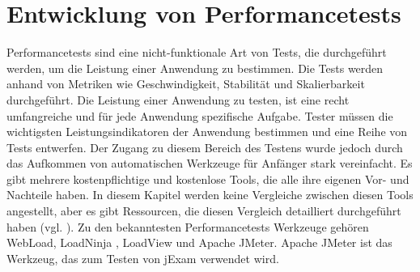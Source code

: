 \section{Entwicklung von Performancetests}

Performancetests sind eine nicht-funktionale Art von Tests, die
durchgeführt werden, um die Leistung einer Anwendung zu bestimmen.
Die Tests werden anhand von Metriken wie Geschwindigkeit, Stabilität
und Skalierbarkeit durchgeführt. Die Leistung einer Anwendung zu testen,
ist eine recht umfangreiche und für jede Anwendung spezifische Aufgabe.
Tester müssen die wichtigsten Leistungsindikatoren der Anwendung bestimmen
und eine Reihe von Tests entwerfen. Der Zugang zu diesem Bereich des
Testens wurde jedoch durch das Aufkommen von automatischen Werkzeuge für
Anfänger stark vereinfacht.  Es gibt mehrere kostenpflichtige und kostenlose
Tools, die alle ihre eigenen Vor- und Nachteile haben. In diesem Kapitel
werden keine Vergleiche zwischen diesen Tools angestellt, aber es gibt
Ressourcen, die diesen Vergleich detailliert durchgeführt haben
(vgl. \cite{perfComp}).  Zu den bekanntesten Performancetests Werkzeuge
gehören WebLoad, LoadNinja , LoadView und Apache JMeter. Apache JMeter
ist das Werkzeug, das zum Testen von jExam verwendet wird.


